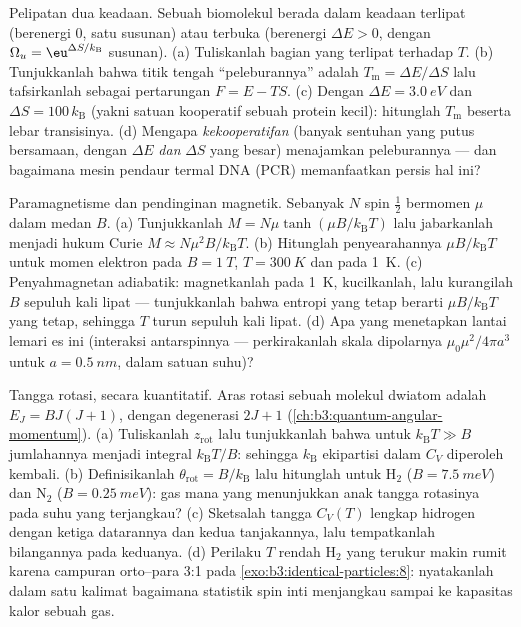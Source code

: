 \begin{exercise}[$\star\star\star$]\label{exo:b3:canonical-ensemble:10}
Pelipatan dua keadaan. Sebuah biomolekul berada dalam keadaan terlipat
(berenergi $0$, satu susunan) atau terbuka (berenergi $\Delta E > 0$,
dengan $\Omega_u =
\eu^{\Delta S/k_{\text{B}}}$ susunan). (a) Tuliskanlah bagian yang
terlipat terhadap $T$. (b) Tunjukkanlah bahwa titik tengah
``peleburannya'' adalah $T_{\text{m}} = \Delta E/\Delta S$ lalu
tafsirkanlah sebagai pertarungan $F = E -
TS$. (c) Dengan $\Delta E = \qty{3.0}{eV}$ dan $\Delta S =
100\,k_{\text{B}}$ (yakni satuan kooperatif sebuah protein kecil):
hitunglah $T_{\text{m}}$ beserta lebar transisinya. (d) Mengapa
\emph{kekooperatifan} (banyak sentuhan yang putus bersamaan, dengan
$\Delta E$ \emph{dan} $\Delta S$ yang besar) menajamkan peleburannya ---
dan bagaimana mesin pendaur termal DNA (PCR) memanfaatkan persis hal
ini?
\end{exercise}

\begin{exercise}[$\star\star\star$]\label{exo:b3:canonical-ensemble:11}
Paramagnetisme dan pendinginan magnetik. Sebanyak $N$ spin $\tfrac12$
bermomen $\mu$ dalam medan $B$. (a) Tunjukkanlah
$M = N\mu\tanh(\mu B/k_{\text{B}}T)$ lalu jabarkanlah menjadi hukum
Curie $M \approx N\mu^2B/k_{\text{B}}T$. (b) Hitunglah penyearahannya
$\mu B/k_{\text{B}}T$ untuk momen elektron pada $B = \qty{1}{T}$,
$T = \qty{300}{K}$ dan pada \qty{1}{K}. (c) Penyahmagnetan adiabatik:
magnetkanlah pada \qty{1}{K}, kucilkanlah, lalu kurangilah $B$ sepuluh
kali lipat --- tunjukkanlah bahwa entropi yang tetap berarti
$\mu B/k_{\text{B}}T$ yang tetap, sehingga $T$ turun sepuluh kali lipat.
(d) Apa yang menetapkan lantai lemari es ini (interaksi antarspinnya ---
perkirakanlah skala dipolarnya $\mu_0\mu^2/4\pi a^3$ untuk $a =
\qty{0.5}{nm}$, dalam satuan suhu)?
\end{exercise}

\begin{exercise}[$\star\star\star$]\label{exo:b3:canonical-ensemble:12}
Tangga rotasi, secara kuantitatif. Aras rotasi sebuah molekul dwiatom
adalah $E_J = BJ(J+1)$, dengan degenerasi $2J + 1$
(\cref{ch:b3:quantum-angular-momentum}). (a) Tuliskanlah
$z_{\text{rot}}$ lalu tunjukkanlah bahwa untuk $k_{\text{B}}T \gg B$
jumlahannya menjadi integral $k_{\text{B}}T/B$: sehingga $k_{\text{B}}$
ekipartisi dalam $C_V$ diperoleh kembali. (b) Definisikanlah $\theta_{\text{rot}} =
B/k_{\text{B}}$ lalu hitunglah untuk H$_2$
($B = \qty{7.5}{meV}$) dan N$_2$ ($B = \qty{0.25}{meV}$): gas mana yang
menunjukkan anak tangga rotasinya pada suhu yang terjangkau? (c)
Sketsalah tangga $C_V(T)$ lengkap hidrogen dengan ketiga datarannya dan
kedua tanjakannya, lalu tempatkanlah bilangannya pada keduanya. (d)
Perilaku $T$ rendah H$_2$ yang terukur makin rumit karena campuran
orto--para 3:1 pada \cref{exo:b3:identical-particles:8}: nyatakanlah
dalam satu kalimat bagaimana statistik spin inti menjangkau sampai ke
kapasitas kalor sebuah gas.
\end{exercise}

